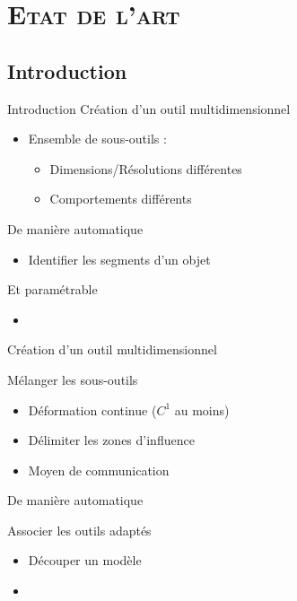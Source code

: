 \documentclass[xcolor=x11names,compress]{beamer}
\renewcommand{\(}{\begin{columns}} \renewcommand{\)}{\end{columns}}
\newcommand{\<}[1]{\begin{column}{#1}} \renewcommand{\>}{\end{column}}
\begin{document}
\section{\scshape Etat de l'art}
\subsection{Introduction}

\begin{frame}{Introduction}
  Création d'un outil multidimensionnel
  \begin{itemize}
  \item Ensemble de sous-outils :
    \begin{itemize}
    \item Dimensions/Résolutions différentes
    \item Comportements différents
    \end{itemize}
  \end{itemize}
  De manière automatique
  \begin{itemize}
  \item Identifier les segments d'un objet
  \end{itemize}
  Et paramétrable
  \begin{itemize}
  \item 
  \end{itemize}
\end{frame}

\begin{frame}{Création d'un outil multidimensionnel}
  \begin{block}{Mélanger les sous-outils}
    \begin{itemize}
    \item Déformation continue ($C^1$ au moins)
    \item Délimiter les zones d'influence
    \item Moyen de communication
    \end{itemize}
  \end{block}
\end{frame}

\begin{frame}{De manière automatique}
  \begin{block}{Associer les outils adaptés}
    \begin{itemize}
    \item Découper un modèle
    \item
    \end{itemize}
  \end{block}
\end{frame}
\end{document}
